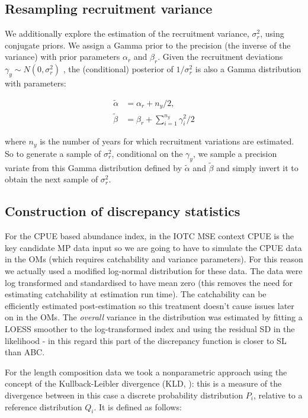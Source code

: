 \documentclass[11pt]{article}
\newcommand{\alp}{\alpha}
\newcommand{\bet}{\beta}
\newcommand{\gam}{\gamma}
\newcommand{\sigr}{\sigma^2_r}
\begin{document}
\subsection*{Resampling recruitment variance}

We additionally explore the estimation of the recruitment variance, $\sigr$, using conjugate priors.
We assign a Gamma prior to the precision (the inverse of the variance) with prior parameters $\alp_r$
and $\bet_r$. Given the recruitment deviations $\gam_y\sim N(0,\sigr)$ , the (conditional) posterior of $1/\sigr$ is also a Gamma distribution with parameters:

\begin{align*}
  \tilde\alp &= \alp_r+n_y/2,\\
  \tilde\bet &= \bet_r+\sum\limits_{i=1}^{n_y}\gam^2_i/2
\end{align*}

where $n_y$ is the number of years for which recruitment variations are estimated. So to generate a
sample of $\sigr$, conditional on the $\gam_y$, we sample a precision variate from this Gamma distribution defined by $\tilde\alp$ and $\tilde\bet$ and simply invert it to obtain the next sample of $\sigr$.

\subsection*{Construction of discrepancy statistics}

For the CPUE based abundance index, in the IOTC MSE context CPUE is the key candidate MP data input so we are going to have to simulate the CPUE data in the OMs (which requires catchability and variance parameters). For this reason we actually used a modified log-normal distribution for these data. The data were log transformed and standardised to have mean zero (this removes the need for estimating catchability at estimation run time). The catchability can be efficiently estimated post-estimation so this treatment doesn't cause issues later on in the OMs. The \emph{overall} variance in the distribution was estimated by fitting a LOESS smoother to the log-transformed index and using the residual SD in the likelihood - in this regard this part of the discrepancy function is closer to SL than ABC.

For the length composition data we took a nonparametric approach using the concept of the Kullback-Leibler divergence (KLD, \cite{kl}): this is a measure of the divergence between in this case a discrete probability distribution $P_i$, relative to a reference distribution $Q_i$. It is defined as follows:
\end{document}
